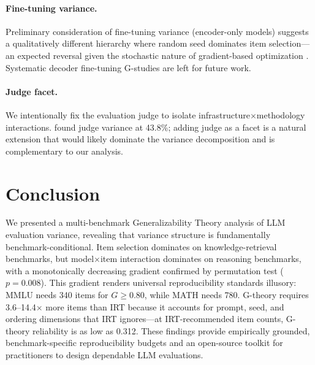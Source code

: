 \documentclass[letterpaper,11pt]{article}
\begin{document}
\paragraph{Fine-tuning variance.}
Preliminary consideration of fine-tuning variance (encoder-only models) suggests a qualitatively different hierarchy where random seed dominates item selection---an expected reversal given the stochastic nature of gradient-based optimization \citep{dodge2020finetuning,bui2025seed}.
Systematic decoder fine-tuning G-studies are left for future work.

\paragraph{Judge facet.}
We intentionally fix the evaluation judge to isolate infrastructure$\times$methodology interactions.
\citet{mesting2026reliability} found judge variance at 43.8\%; adding judge as a facet is a natural extension that would likely dominate the variance decomposition and is complementary to our analysis.

\section{Conclusion}

We presented a multi-benchmark Generalizability Theory analysis of LLM evaluation variance, revealing that variance structure is fundamentally benchmark-conditional.
Item selection dominates on knowledge-retrieval benchmarks, but model$\times$item interaction dominates on reasoning benchmarks, with a monotonically decreasing gradient confirmed by permutation test ($p = 0.008$).
This gradient renders universal reproducibility standards illusory: MMLU needs 340 items for $G \geq 0.80$, while MATH needs 780.
G-theory requires 3.6--14.4$\times$ more items than IRT because it accounts for prompt, seed, and ordering dimensions that IRT ignores---at IRT-recommended item counts, G-theory reliability is as low as 0.312.
These findings provide empirically grounded, benchmark-specific reproducibility budgets and an open-source toolkit for practitioners to design dependable LLM evaluations.



\end{document}
